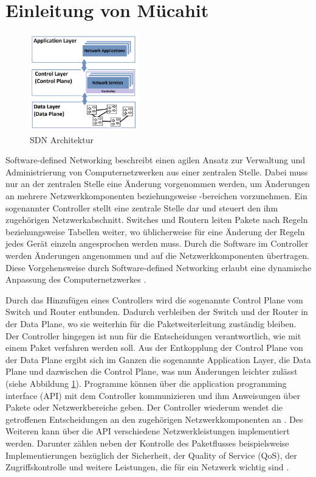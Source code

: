 \documentclass[fontsize=12pt,paper=a4,open=any,parskip=half,
  twoside=false,toc=listof,toc=bibliography,fleqn,leqno,
  captions=nooneline,captions=tableabove,british]{scrbook}
\begin{document}
\section*{Einleitung von Mücahit}\label{einl-müco}
\begin{figure}
	\vspace{-\baselineskip}
	\centering
	\includegraphics[width=0.42\textwidth]{Bilder/layer2}
	\caption{SDN Architektur}
	\label{layer2}
\end{figure}
Software-defined Networking beschreibt einen agilen Ansatz zur Verwaltung und Administrierung von Computernetzwerken aus einer zentralen Stelle. Dabei muss nur an der zentralen Stelle eine Änderung vorgenommen werden, um Änderungen an mehrere Netzwerkkomponenten beziehungsweise -bereichen vorzunehmen. Ein sogenannter Controller stellt eine zentrale Stelle dar und steuert den ihm zugehörigen Netzwerkabschnitt. Switches und Routern leiten Pakete nach Regeln beziehungsweise Tabellen weiter, wo üblicherweise für eine Änderung der Regeln jedes Gerät einzeln angesprochen werden muss. Durch die Software im Controller werden Änderungen angenommen und auf die Netzwerkkomponenten übertragen. Diese Vorgehensweise durch Software-defined Networking erlaubt eine dynamische Anpassung des Computernetzwerkes \cite[1-2]{sdn1}.\par 
Durch das Hinzufügen eines Controllers wird die sogenannte Control Plane vom Switch und Router entbunden. Dadurch verbleiben der Switch und der Router in der Data Plane, wo sie weiterhin für die Paketweiterleitung zuständig bleiben. Der Controller hingegen ist nun für die Entscheidungen verantwortlich, wie mit einem Paket verfahren werden soll. Aus der Entkopplung der Control Plane von der Data Plane ergibt sich im Ganzen die sogenannte Application Layer, die Data Plane und dazwischen die Control Plane, was nun Änderungen leichter zulässt (siehe Abbildung \ref{layer2}). Programme können über die application programming interface (API) mit dem Controller kommunizieren und ihm Anweisungen über Pakete oder Netzwerkbereiche geben. Der Controller wiederum wendet die getroffenen Entscheidungen an den zugehörigen Netzwerkkomponenten an \cite[2]{sdn2}. Des Weiteren kann über die API verschiedene Netzwerkleistungen implementiert werden. Darunter zählen neben der Kontrolle des Paketflusses beispielsweise Implementierungen bezüglich der Sicherheit, der Quality of Service (QoS), der Zugriffskontrolle und weitere Leistungen, die für ein Netzwerk wichtig sind \cite[8-9]{sdn2}. \par
\end{document}
